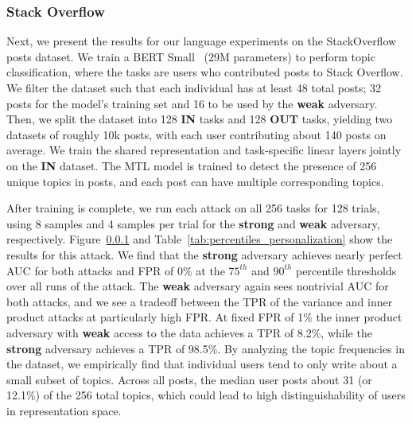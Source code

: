 \subsubsection{Stack Overflow} \label{sec:stackoverflow}


Next, we present the results for our language experiments on the StackOverflow posts dataset. We train a BERT Small~\cite{bertsmall_1} (29M parameters) to perform topic classification, where the tasks are users who contributed posts to Stack Overflow. We filter the dataset such that each individual has at least 48 total posts; 32 posts for the model's training set and 16 to be used by the \textbf{weak} adversary. Then, we split the dataset into 128 \textbf{IN} tasks and 128 \textbf{OUT} tasks, yielding two datasets of roughly 10k posts, with each user contributing about 140 posts on average. We train the shared representation and task-specific linear layers jointly on the \textbf{IN} dataset. The MTL model is trained to detect the presence of 256 unique topics in posts, and each post can have multiple corresponding topics. 

After training is complete, we run each attack on all 256 tasks for 128 trials, using 8 samples and 4 samples per trial for the \textbf{strong} and \textbf{weak} adversary, respectively. Figure~\ref{sec:stackoverflow} and Table~\ref{tab:percentiles_personalization} show the results for this attack. We find that the \textbf{strong} adversary achieves nearly perfect AUC for both attacks and FPR of 0\% at the $75^{th}$ and $90^{th}$ percentile thresholds over all runs of the attack. The \textbf{weak} adversary again sees nontrivial AUC for both attacks, and we see a tradeoff between the TPR of the variance and inner product attacks at particularly high FPR. At fixed FPR of 1\% the inner product adversary with \textbf{weak} access to the data achieves a TPR of 8.2\%, while the \textbf{strong} adversary achieves a TPR of 98.5\%. By analyzing the topic frequencies in the dataset, we empirically find that individual users tend to only write about a small subset of topics. Across all posts, the median user posts about 31 (or 12.1\%) of the 256 total topics, which could lead to high distinguishability of users in representation space.



